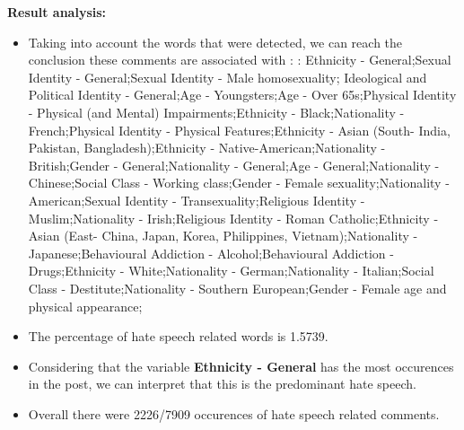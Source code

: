 \documentclass[11pt]{article}
\newlength\mylength
\begin{document}
\begin{center}
\begin{longtable}{|C{.50\mylength}|C{.30\mylength}|C{.15\mylength}|C{.15\mylength}|C{.15\mylength}|}
\end{longtable}
\end{center}


\textbf{\Large Result analysis:}

\begin{itemize}\item Taking into account the words that were detected, we can reach the conclusion these comments are associated with : : Ethnicity - General;Sexual Identity - General;Sexual Identity - Male homosexuality; Ideological and Political Identity - General;Age - Youngsters;Age - Over 65s;Physical Identity - Physical (and Mental) Impairments;Ethnicity - Black;Nationality - French;Physical Identity - Physical Features;Ethnicity - Asian (South- India, Pakistan, Bangladesh);Ethnicity - Native-American;Nationality - British;Gender - General;Nationality - General;Age - General;Nationality - Chinese;Social Class - Working class;Gender - Female sexuality;Nationality - American;Sexual Identity - Transexuality;Religious Identity - Muslim;Nationality - Irish;Religious Identity - Roman Catholic;Ethnicity - Asian (East- China, Japan, Korea, Philippines, Vietnam);Nationality - Japanese;Behavioural Addiction - Alcohol;Behavioural Addiction - Drugs;Ethnicity - White;Nationality - German;Nationality - Italian;Social Class - Destitute;Nationality - Southern European;Gender - Female age and physical appearance;%

\item The percentage of hate speech related words is 1.5739.

\item Considering that the variable \textbf{Ethnicity - General} has the most occurences in the post, we can interpret that this is the predominant hate speech.

\item Overall there were 2226/7909 occurences of hate speech related comments.\end{itemize}
\end{document}
